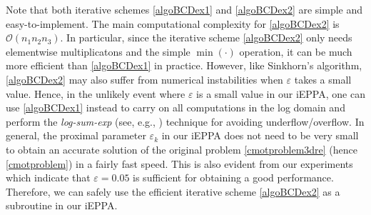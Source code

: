 \documentclass[10pt]{article}
\begin{document}
Note that both iterative schemes \eqref{algoBCDex1} and
\eqref{algoBCDex2} are simple and easy-to-implement. The main computational complexity
for \eqref{algoBCDex2} is $\mathcal{O}(n_1 n_2 n_3)$. In particular, since the iterative scheme \eqref{algoBCDex2} only needs elementwise multiplicatons and the simple $\min(\cdot)$ operation, it can be much more efficient than \eqref{algoBCDex1} in practice. However, like Sinkhorn's algorithm, \eqref{algoBCDex2} may also suffer from numerical instabilities when $\varepsilon$ takes a small value. Hence, in the unlikely event where $\varepsilon$ is a small value in our iEPPA, one can use \eqref{algoBCDex1} instead to carry on all computations in the log domain and perform the \textit{log-sum-exp} (see, e.g., \cite[Section 4.4]{pc2019computational}) technique for avoiding underflow/overflow. In general, the proximal parameter $\varepsilon_k$ in our iEPPA does not need to be very small to obtain an accurate solution of the original problem \eqref{cmotproblem3dre} (hence \eqref{cmotproblem}) in a fairly fast speed. This is also evident from our experiments which indicate that $\varepsilon = 0.05$ is sufficient for obtaining a good performance. Therefore, we can safely use the efficient iterative scheme \eqref{algoBCDex2} as a subroutine in our iEPPA.
\end{document}
